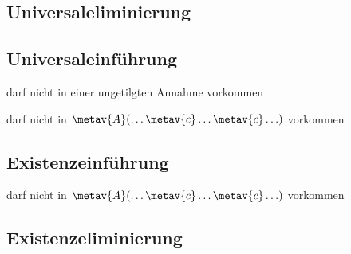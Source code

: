 \begin{multicols}{2}
\subsection*{Universaleliminierung}

\begin{fitchproof}
	 
\end{fitchproof}

\subsection*{Universaleinführung}

\begin{fitchproof}
	 
\end{fitchproof}

\medskip%
\noindent {} darf nicht in einer ungetilgten Annahme vorkommen

\noindent {} darf nicht in $\metav{A}(\ldots \metav{c} \ldots \metav{c}\ldots)$ vorkommen

\subsection*{Existenzeinführung}

\begin{fitchproof}
\end{fitchproof}

\medskip%
\noindent {} darf nicht in $\metav{A}(\ldots \metav{c} \ldots \metav{c}\ldots)$ vorkommen

\subsection*{Existenzeliminierung}


\end{multicols}
